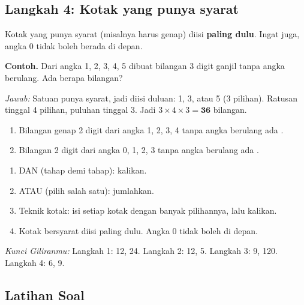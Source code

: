 \documentclass[11pt,a4paper]{article}
\begin{document}
\subsection*{Langkah 4: Kotak yang punya syarat}
Kotak yang punya syarat (misalnya harus genap) diisi \textbf{paling dulu}. Ingat juga, angka 0
tidak boleh berada di depan.

\begin{contoh}
\textbf{Contoh.} Dari angka 1, 2, 3, 4, 5 dibuat bilangan 3 digit ganjil tanpa angka berulang.
Ada berapa bilangan?

\textit{Jawab:} Satuan punya syarat, jadi diisi duluan: 1, 3, atau 5 (3 pilihan). Ratusan
tinggal 4 pilihan, puluhan tinggal 3. Jadi $3 \times 4 \times 3 = \textbf{36}$ bilangan.
\end{contoh}

\begin{giliranmu}
\begin{enumerate}[label=\alph*.]
    \item Bilangan genap 2 digit dari angka 1, 2, 3, 4 tanpa angka berulang ada \kosong.
    \item Bilangan 2 digit dari angka 0, 1, 2, 3 tanpa angka berulang ada \kosong.
\end{enumerate}
\end{giliranmu}

\begin{rangkuman}
\begin{enumerate}
    \item DAN (tahap demi tahap): kalikan.
    \item ATAU (pilih salah satu): jumlahkan.
    \item Teknik kotak: isi setiap kotak dengan banyak pilihannya, lalu kalikan.
    \item Kotak bersyarat diisi paling dulu. Angka 0 tidak boleh di depan.
\end{enumerate}
\end{rangkuman}

\textit{Kunci Giliranmu:} Langkah 1: 12, 24. \quad Langkah 2: 12, 5. \quad Langkah 3: 9, 120.
\quad Langkah 4: 6, 9.

\newpage
\subsection*{Latihan Soal}
\end{document}
